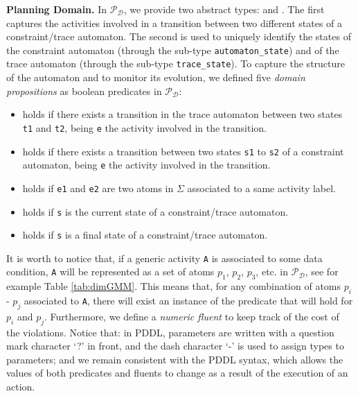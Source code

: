 \medskip
\noindent
\textbf{Planning Domain.}
%
In $\mathcal{P_D}$, we provide two abstract types:  and .
%
The first captures the activities involved in a transition between two different states of a constraint/trace automaton.
%
The second is used to uniquely identify the states of the constraint automaton (through the sub-type \texttt{automaton\_state}) and of the trace automaton (through the sub-type \texttt{trace\_state}).
%
To capture the structure of the automaton and to monitor its evolution, we defined five \emph{domain propositions} as boolean predicates in $\mathcal{P_D}$:
%
\begin{itemize}
	\item {} holds if there exists a transition in the trace automaton between two states \texttt{t1} and \texttt{t2}, being \texttt{e} the activity involved in the transition.
	\item {} holds if there exists a transition between two states \texttt{s1} to \texttt{s2} of a constraint automaton, being \texttt{e} the activity involved in the transition.
    \item {} holds if \texttt{e1} and \texttt{e2} are two atoms in $\Sigma$ associated to a same activity label.
	\item {} holds if \texttt{s} is the current state of a constraint/trace automaton.
	\item {} holds if \texttt{s} is a final state of a constraint/trace automaton.
\end{itemize}
It is worth to notice that, if a generic activity \texttt{A} is associated to some data condition, \texttt{A} will be represented as a set of atoms $p_1$, $p_2$, $p_3$, etc. in $\mathcal{P_D}$, see for example Table \ref{tab:dimGMM}. This means that, for any combination of atoms $p_i$ - $p_j$ associated to \texttt{A}, there will exist an instance of the predicate  that will hold for $p_i$ and $p_j$.
%
%
Furthermore, we define a \emph{numeric fluent}  to keep track of the cost of the violations. Notice that: \myi in PDDL, parameters are written with a question mark character `?' in front, and the dash character `-' is used to assign types to parameters; and \myii we remain consistent with the PDDL syntax, which allows the values of both predicates and fluents to change as a result of the execution of an action.
%


